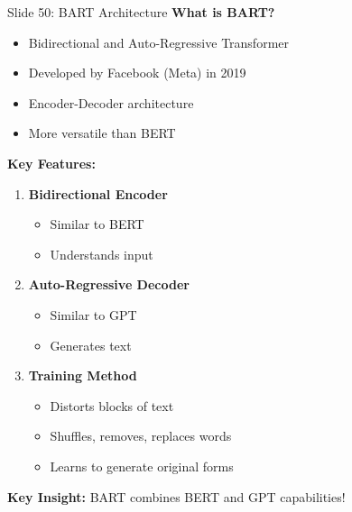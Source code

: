 \documentclass[8pt]{beamer}
\begin{document}
	\begin{frame}{Slide 50: BART Architecture}
		\fontsize{6.5}{7.5}\selectfont
		\textbf{What is BART?}
		\begin{itemize}
			\item Bidirectional and Auto-Regressive Transformer
			\item Developed by Facebook (Meta) in 2019
			\item Encoder-Decoder architecture
			\item More versatile than BERT
		\end{itemize}
		
		\vspace{0.1cm}
		\textbf{Key Features:}
		\begin{enumerate}
			\item \textbf{Bidirectional Encoder}
			\begin{itemize}
				\item Similar to BERT
				\item Understands input
			\end{itemize}
			\item \textbf{Auto-Regressive Decoder}
			\begin{itemize}
				\item Similar to GPT
				\item Generates text
			\end{itemize}
			\item \textbf{Training Method}
			\begin{itemize}
				\item Distorts blocks of text
				\item Shuffles, removes, replaces words
				\item Learns to generate original forms
			\end{itemize}
		\end{enumerate}
		
		\textcolor{myblue}{\textbf{Key Insight:}} BART combines BERT and GPT capabilities!
	\end{frame}
	
	
\end{document}
